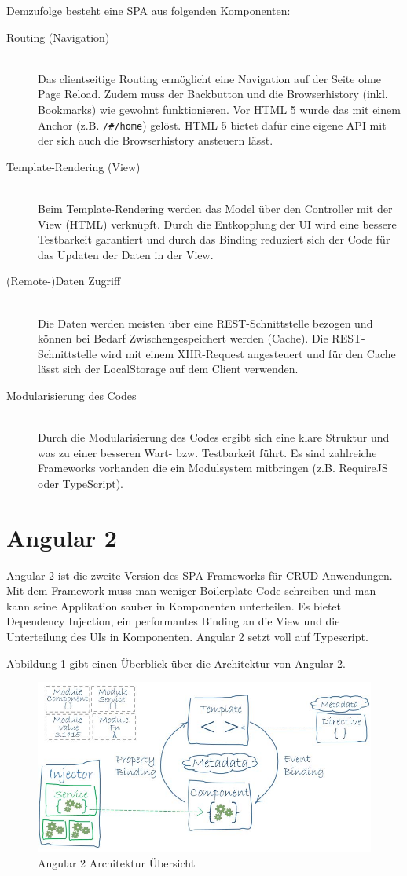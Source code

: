 \newpage

Demzufolge besteht eine SPA aus folgenden Komponenten:
\begin{description}
	\item[Routing (Navigation)] \hfil \\
	Das clientseitige Routing ermöglicht eine Navigation auf der Seite ohne Page Reload. Zudem muss der Backbutton und die Browserhistory (inkl. Bookmarks) wie gewohnt funktionieren. Vor HTML 5 wurde das mit einem Anchor (z.B. \lstinline|/#/home|) gelöst. HTML 5 bietet dafür eine eigene API mit der sich auch die Browserhistory ansteuern lässt.
	\item[Template-Rendering (View)] \hfil \\
	Beim Template-Rendering werden das Model über den Controller mit der View (HTML) verknüpft. Durch die Entkopplung der UI wird eine bessere Testbarkeit garantiert und durch das Binding reduziert sich der Code für das Updaten der Daten in der View.
	\item[(Remote-)Daten Zugriff] \hfil \\
	Die Daten werden meisten über eine REST-Schnittstelle bezogen und können bei Bedarf Zwischengespeichert werden (Cache). Die REST-Schnittstelle wird mit einem XHR-Request angesteuert und für den Cache lässt sich der LocalStorage auf dem Client verwenden.
	\item[Modularisierung des Codes] \hfil \\
	Durch die Modularisierung des Codes ergibt sich eine klare Struktur und was zu einer besseren Wart- bzw. Testbarkeit führt. Es sind zahlreiche Frameworks vorhanden die ein Modulsystem mitbringen (z.B. RequireJS oder TypeScript).
\end{description}

\section{Angular 2}

Angular 2 ist die zweite Version des SPA Frameworks für CRUD Anwendungen. Mit dem Framework muss man weniger Boilerplate Code schreiben und man kann seine Applikation sauber in Komponenten unterteilen. Es bietet Dependency Injection, ein performantes Binding an die View und die Unterteilung des UIs in Komponenten. Angular 2 setzt voll auf Typescript.

Abbildung \ref{fig:angular2-architecture} gibt einen Überblick über die Architektur von Angular 2.
\begin{figure}[h!]
\centering
\includegraphics[width=0.7\linewidth]{fig/angular2-architecture}
\caption{Angular 2 Architektur Übersicht}
\label{fig:angular2-architecture}
\end{figure}

